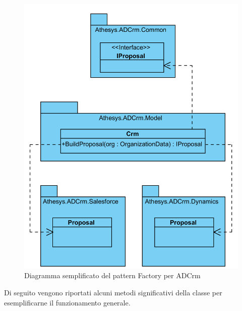 \begin{figure}[H]
	\centering
	\includegraphics[width=\linewidth]{images/factoryInADCrm}
	\caption{Diagramma semplificato del pattern Factory per ADCrm}
	\label{fig:factoryInADCrm}
\end{figure}
Di seguito vengono riportati alcuni metodi significativi della classe per esemplificarne il funzionamento generale.


